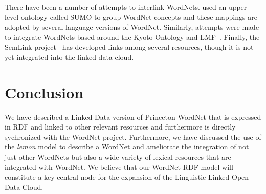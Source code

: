 \documentclass[10pt, a4paper]{article}
\newcommand{\lemon}[0]{\emph{lemon}}
\begin{document}
There have been a number of attempts to interlink WordNets. 
\cite{pease2009formal} used an upper-level ontology called SUMO to group WordNet
concepts and these mappings are adopted by several language versions of WordNet.
Similarly, attempts were made to integrate WordNets based around the Kyoto
Ontology and LMF~\cite{soria2009wordnet}. Finally, the SemLink
project~\cite{palmer2009semlink} has
developed links among several resources, though it is not yet integrated into
the linked data cloud.

\section{Conclusion}

We have described a Linked Data version of Princeton WordNet that is expressed in RDF and linked to other relevant resources and furthermore is directly sychronized with the WordNet project.
Furthermore, we have discussed
the use of the \lemon{} model to describe a WordNet and ameliorate the
integration of not just other WordNets but also a wide variety of lexical
resources that are integrated with WordNet. We believe that our WordNet RDF model 
will constitute a key central node for the expansion of the Linguistic
Linked Open Data Cloud.



\end{document}
